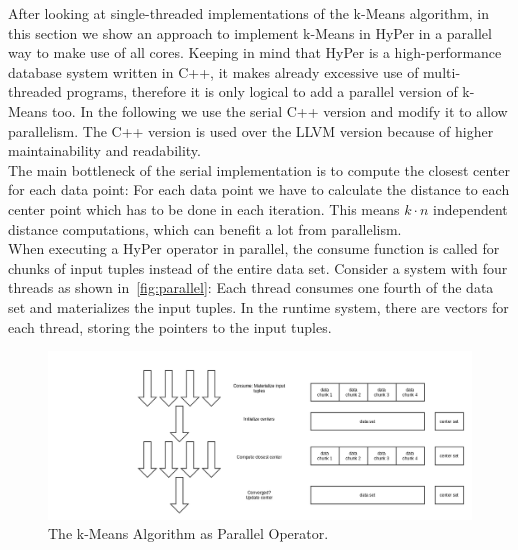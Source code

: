 After looking at single-threaded implementations of the k-Means algorithm, in this section we show an approach to implement k-Means in HyPer in a parallel way to make use of all cores. Keeping in mind that HyPer is a high-performance database system written in C++, it makes already excessive use of multi-threaded programs, therefore it is only logical to add a parallel version of k-Means too. In the following we use the serial C++ version and modify it to allow parallelism. The C++ version is used over the LLVM version because of higher maintainability and readability. 
\\
The main bottleneck of the serial implementation is to compute the closest center for each data point: For each data point we have to calculate the distance to each center point which has to be done in each iteration. This means $k \cdot n$ independent distance computations, which can benefit a lot from parallelism.
\\
When executing a HyPer operator in parallel, the consume function is called for chunks of input tuples instead of the entire data set. Consider a system with four threads as shown in~\autoref{fig:parallel}: Each thread consumes one fourth of the data set and materializes the input tuples. In the runtime system, there are vectors for each thread, storing the pointers to the input tuples. 


\begin{figure}[htsb]
  \centering
  \includegraphics[scale=0.3]{figures/parallel}
  \caption[The k-Means Algorithm as Parallel Operator]{The k-Means Algorithm as Parallel Operator.}
  \label{fig:parallel}
\end{figure}

